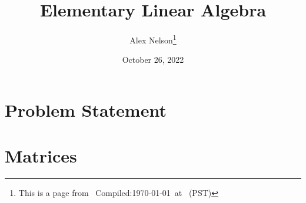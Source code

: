 \documentclass{article}
\title{Elementary Linear Algebra}
\author{Alex Nelson\thanks{This is a page from \homeurl{}\hfil\break\indent\;\, Compiled:\enspace\today\ at \currenttime\ (PST)}}
\date{October 26, 2022}
\begin{document}
\maketitle
\tableofcontents

\part{Problem Statement}

\part{Matrices}


\appendix


\end{document}

